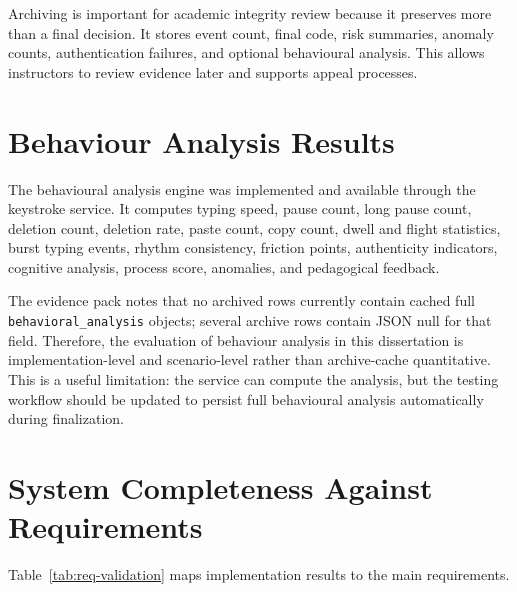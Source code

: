 Archiving is important for academic integrity review because it preserves more than a final decision. It stores event count, final code, risk summaries, anomaly counts, authentication failures, and optional behavioural analysis. This allows instructors to review evidence later and supports appeal processes.

\section{Behaviour Analysis Results}
\label{sec:behaviour-results}

The behavioural analysis engine was implemented and available through the keystroke service. It computes typing speed, pause count, long pause count, deletion count, deletion rate, paste count, copy count, dwell and flight statistics, burst typing events, rhythm consistency, friction points, authenticity indicators, cognitive analysis, process score, anomalies, and pedagogical feedback.

The evidence pack notes that no archived rows currently contain cached full \texttt{behavioral\_analysis} objects; several archive rows contain JSON null for that field. Therefore, the evaluation of behaviour analysis in this dissertation is implementation-level and scenario-level rather than archive-cache quantitative. This is a useful limitation: the service can compute the analysis, but the testing workflow should be updated to persist full behavioural analysis automatically during finalization.

\section{System Completeness Against Requirements}
\label{sec:requirements-completeness}

Table~\ref{tab:req-validation} maps implementation results to the main requirements.

